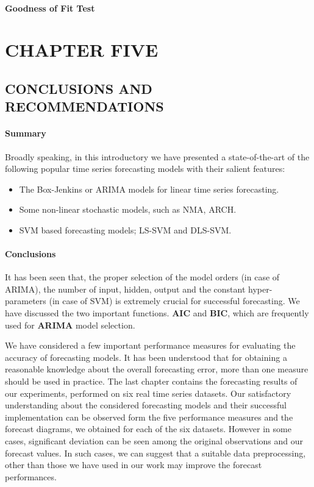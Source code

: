 \documentclass[10pt]{report}
\begin{document}
\begin{flushleft}
		\subsubsection{Goodness of Fit Test}
		\chapter{CHAPTER  FIVE}
		\section{CONCLUSIONS AND RECOMMENDATIONS}
		\subsubsection{Summary}
			Broadly speaking, in this introductory we have presented a state-of-the-art of the following popular time series forecasting models with their salient features:
		\begin{itemize}
			\item  The Box-Jenkins or ARIMA models for linear time series forecasting. 
			\item Some non-linear stochastic models, such as NMA, ARCH. 
			\item SVM based forecasting models; LS-SVM and DLS-SVM.
		\end{itemize} 
		\subsubsection{ Conclusions}
		It has been seen that, the proper selection of the model orders (in case of ARIMA), the number of input, hidden, output  and the constant hyper-parameters (in case of SVM) is extremely crucial for successful forecasting. We have discussed the two important functions. \textbf{AIC} and \textbf{BIC}, which are frequently used for \textbf{ARIMA} model selection. 
	
		We have considered a few important performance measures for evaluating the accuracy of forecasting models. It has been understood that for obtaining a reasonable knowledge about the overall forecasting error, more than one measure should be used in practice. The last chapter contains the forecasting results of our experiments, performed on six real time series datasets. 
		Our satisfactory understanding about the considered forecasting models and their successful implementation can be observed form the five performance measures and the forecast diagrams, we obtained for each of the six datasets. However in some cases, significant deviation can be seen among the original observations and our forecast values. In such cases, we can suggest that a suitable data preprocessing, other than those we have used in our work may improve the forecast performances. 

\end{flushleft}
\end{document}
